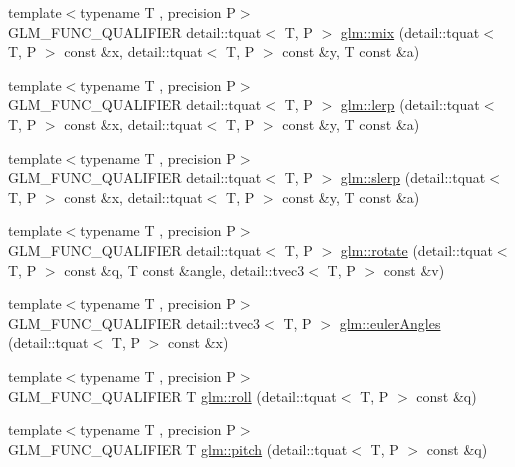 \begin{DoxyCompactItemize}
\item 
{\footnotesize template$<$typename T , precision P$>$ }\\G\+L\+M\+\_\+\+F\+U\+N\+C\+\_\+\+Q\+U\+A\+L\+I\+F\+I\+ER detail\+::tquat$<$ T, P $>$ \hyperlink{group__gtc__quaternion_gafabf175ae3e2cd30bf58dc313321955a}{glm\+::mix} (detail\+::tquat$<$ T, P $>$ const \&x, detail\+::tquat$<$ T, P $>$ const \&y, T const \&a)
\item 
{\footnotesize template$<$typename T , precision P$>$ }\\G\+L\+M\+\_\+\+F\+U\+N\+C\+\_\+\+Q\+U\+A\+L\+I\+F\+I\+ER detail\+::tquat$<$ T, P $>$ \hyperlink{group__gtc__quaternion_gafc1c989eaa2c786d34218b176f680fe0}{glm\+::lerp} (detail\+::tquat$<$ T, P $>$ const \&x, detail\+::tquat$<$ T, P $>$ const \&y, T const \&a)
\item 
{\footnotesize template$<$typename T , precision P$>$ }\\G\+L\+M\+\_\+\+F\+U\+N\+C\+\_\+\+Q\+U\+A\+L\+I\+F\+I\+ER detail\+::tquat$<$ T, P $>$ \hyperlink{group__gtc__quaternion_ga7468a211a20ea56ea5cfb0625226868a}{glm\+::slerp} (detail\+::tquat$<$ T, P $>$ const \&x, detail\+::tquat$<$ T, P $>$ const \&y, T const \&a)
\item 
{\footnotesize template$<$typename T , precision P$>$ }\\G\+L\+M\+\_\+\+F\+U\+N\+C\+\_\+\+Q\+U\+A\+L\+I\+F\+I\+ER detail\+::tquat$<$ T, P $>$ \hyperlink{group__gtc__quaternion_gaa9a8891f03d8f5373525c4b3159c1c73}{glm\+::rotate} (detail\+::tquat$<$ T, P $>$ const \&q, T const \&angle, detail\+::tvec3$<$ T, P $>$ const \&v)
\item 
{\footnotesize template$<$typename T , precision P$>$ }\\G\+L\+M\+\_\+\+F\+U\+N\+C\+\_\+\+Q\+U\+A\+L\+I\+F\+I\+ER detail\+::tvec3$<$ T, P $>$ \hyperlink{group__gtc__quaternion_gade4034f49ccadf63cb31a7fb5fa3c8aa}{glm\+::euler\+Angles} (detail\+::tquat$<$ T, P $>$ const \&x)
\item 
{\footnotesize template$<$typename T , precision P$>$ }\\G\+L\+M\+\_\+\+F\+U\+N\+C\+\_\+\+Q\+U\+A\+L\+I\+F\+I\+ER T \hyperlink{group__gtc__quaternion_ga6d883e423bc425f4334fcce202131f7e}{glm\+::roll} (detail\+::tquat$<$ T, P $>$ const \&q)
\item 
{\footnotesize template$<$typename T , precision P$>$ }\\G\+L\+M\+\_\+\+F\+U\+N\+C\+\_\+\+Q\+U\+A\+L\+I\+F\+I\+ER T \hyperlink{group__gtc__quaternion_ga4d345dc369a54f53f5ebc375bac56d11}{glm\+::pitch} (detail\+::tquat$<$ T, P $>$ const \&q)

\end{DoxyCompactItemize}
